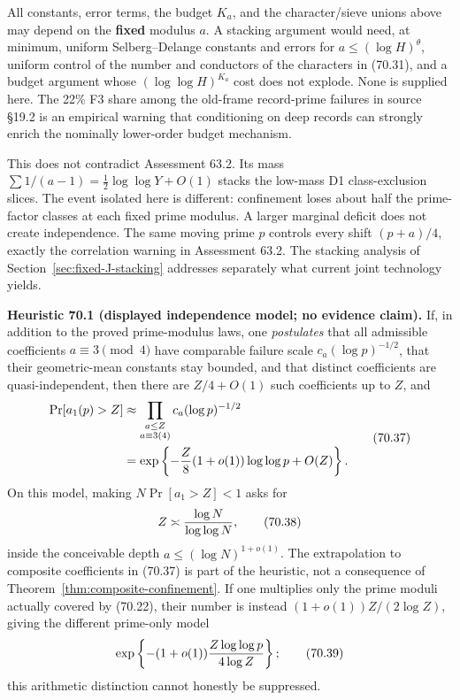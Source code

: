 \documentclass[10pt,reqno]{amsart}
\theoremstyle{definition}
\newcommand{\1}{\mathbf 1}
\begin{document}
All constants, error terms, the budget $K_a$, and the character/sieve
unions above may depend on the \textbf{fixed} modulus $a$.  A stacking argument
would need, at minimum, uniform Selberg--Delange constants and errors for
$a\leq(\log H)^\theta$, uniform control of the number and conductors of
the characters in (70.31), and a budget argument whose
$(\log\log H)^{K_a}$ cost does not explode.  None is supplied here.  The
22\% F3 share among the old-frame record-prime failures in source \S19.2 is an
empirical warning that conditioning on deep records can strongly enrich the
nominally lower-order budget mechanism.

This does not contradict Assessment 63.2.  Its mass
$\sum1/(a-1)=\tfrac12\log\log Y+O(1)$ stacks the low-mass D1
class-exclusion slices.  The event isolated here is different: confinement
loses about half the prime-factor classes at each fixed prime modulus.  A
larger marginal deficit does not create independence.  The same moving
prime $p$ controls every shift $(p+a)/4$, exactly the correlation warning
in Assessment 63.2.  The stacking analysis of Section~\ref{sec:fixed-J-stacking} addresses separately what current
joint technology yields.

\medskip\noindent\textbf{Heuristic 70.1 (displayed independence model; no evidence claim).}  If,
in addition to the proved prime-modulus laws, one \emph{postulates} that all
admissible coefficients $a\equiv3\pmod4$ have comparable failure scale
$c_a(\log p)^{-1/2}$, that their geometric-mean constants stay bounded,
and that distinct coefficients are quasi-independent, then there are
$Z/4+O(1)$ such coefficients up to $Z$, and
\begin{equation}
 \begin{split}
 \Pr[a_1(p)>Z]
 &\approx\prod_{\substack{a\leq Z\\a\equiv3(4)}}
             c_a(\log p)^{-1/2}\\
 &=\exp\left\{-{Z\over8}(1+o(1))\log\log p+O(Z)\right\}.
 \end{split}
                                                               \tag{70.37}
\end{equation}
On this model, making $N\Pr[a_1>Z]<1$ asks for
\begin{equation}
                       Z\asymp {\log N\over\log\log N},    \tag{70.38}
\end{equation}
inside the conceivable depth $a\leq(\log N)^{1+o(1)}$.  The extrapolation
to composite coefficients in (70.37) is part of the heuristic, not a
consequence of Theorem~\ref{thm:composite-confinement}.  If one multiplies only the prime moduli
actually covered by (70.22), their number is instead
$(1+o(1))Z/(2\log Z)$, giving the different prime-only model
\begin{equation}
 \exp\left\{-(1+o(1)){Z\log\log p\over4\log Z}\right\};    \tag{70.39}
\end{equation}
this arithmetic distinction cannot honestly be suppressed.
\end{document}
